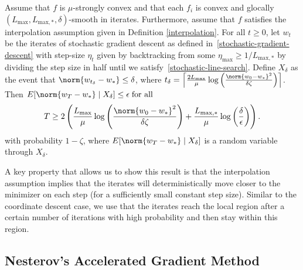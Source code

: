 \documentclass[10pt]{article} %
\begin{document}
\begin{theorem}
    \label{stochastic-theorem}
    Assume that $f$ is $\mu$-strongly convex and that each $f_i$ is convex and glocally $(L_{\text{max}}, L_{\text{max},*}, \delta)$-smooth in iterates.  Furthermore, assume that $f$ satisfies the interpolation assumption given in Definition \ref{interpolation}. For all $t \geq 0$, let $w_t$ be the iterates of stochastic gradient descent as defined in~\eqref{stochastic-gradient-descent} with step-size $\eta_t$ given by backtracking from some $\eta_\text{max} \geq 1/L_{\text{max},*}$ by dividing the step size in half until we satisfy~\eqref{stochastic-line-search}. Define $X_{\delta}$ as the event that $\norm{w_{t_{\delta}} - w_{*}} \leq \delta$, where $t_\delta = \left\lceil\frac{2L_{\text{max}}}{\mu}\log\left(\frac{\norm{w_0 - w_*}^2}{\delta\zeta}\right)\right\rceil$. Then $E[\norm{w_{T} - w_{*}} \;|\;X_{\delta}] \leq \epsilon \;\text{for all}$
    \begin{equation*}
        T \geq
        2\left(\frac{L_{\text{max}}}{\mu}\log\left(\frac{\norm{w_0 - w_*}^2}{\delta \zeta}\right) + \frac{L_{\text{max},*}}{\mu}\log\left(\frac{\delta}{\epsilon}\right)\right).
    \end{equation*}
    with probability $1 - \zeta$, where $E[\norm{w_{T} - w_{*}}\;|\; X_{\delta}]$ is a random variable through $X_{\delta}$.
\end{theorem}
A key property that allows us to show this result is that the interpolation assumption implies that the iterates will deterministically move closer to the minimizer on each step (for a sufficiently small constant step size). 
Similar to the coordinate descent case, we use that the iterates reach the local region after a certain number of iterations with high probability and then stay within this region.


\subsection{Nesterov's Accelerated Gradient Method}
\label{acceleration-section}
\end{document}
